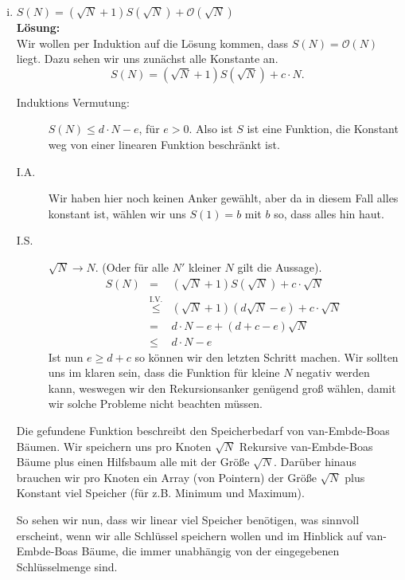 \documentclass[11pt,a4paper,ngerman]{article}
\begin{document}
\begin{enumerate}[(i)]
	\item $S(N) = \left( \sqrt{N} + 1 \right) S( \sqrt{N}) + \mathcal{O}(\sqrt{N})$\\
	\noindent\textbf{Lösung:}\\
		Wir wollen per Induktion auf die Lösung kommen, dass $S(N) = \mathcal{O}(N)$ liegt. Dazu sehen wir uns zunächst alle Konstante
		an.
		$$
			S(N) = (\sqrt{N} + 1 ) S( \sqrt{N}) + c \cdot N.
		$$
		\begin{description}
			\item[Induktions Vermutung:] $S(N) \leq d \cdot N - e$, für $e > 0$. Also ist $S$ ist eine Funktion, die Konstant weg
			von einer linearen Funktion beschränkt ist.
			\item[I.A.] Wir haben hier noch keinen Anker gewählt, aber da in diesem Fall alles konstant ist, wählen wir uns
				$S(1) = b$ mit $b$ so, dass alles hin haut.
			\item[I.S.] $\sqrt{N} \rightarrow N$. (Oder für alle $N'$ kleiner $N$ gilt die Aussage).\\
				$$\begin{array}{rcl}
					S(N) &=& (\sqrt{N} + 1) S(\sqrt{N}) + c \cdot \sqrt{N}\\
						&\stackrel{\text{I.V.}}{\leq}& (\sqrt{N} + 1) (d \sqrt{N} - e) + c \cdot \sqrt{N}\\
						&=& d \cdot N - e + (d + c - e) \sqrt{N}\\
						&\leq& d \cdot N - e
				\end{array}$$
				Ist nun $e \geq d +c$ so können wir den letzten Schritt machen. Wir sollten uns im klaren sein,
				dass die Funktion für kleine $N$ negativ werden kann, weswegen wir den Rekursionsanker genügend groß
				wählen, damit wir solche Probleme nicht beachten müssen.
		\end{description}

		Die gefundene Funktion beschreibt den Speicherbedarf von van-Embde-Boas Bäumen. Wir speichern uns pro Knoten
		$\sqrt{N}$ Rekursive van-Embde-Boas Bäume plus einen Hilfsbaum alle mit der Größe $\sqrt{N}$. Darüber hinaus
		brauchen wir pro Knoten ein Array (von Pointern) der Größe $\sqrt{N}$ plus Konstant viel Speicher (für z.B. Minimum und Maximum).
		
		So sehen wir nun, dass wir linear viel Speicher benötigen, was sinnvoll erscheint, wenn wir alle Schlüssel speichern wollen und im Hinblick
		auf van-Embde-Boas Bäume, die immer unabhängig von der eingegebenen Schlüsselmenge sind.
\end{enumerate}
\end{document}
